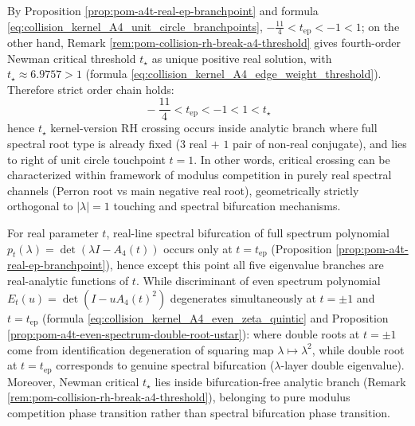 \begin{remark}\label{rem:pom-a4t-newman-unit-circle-separation}
By Proposition \ref{prop:pom-a4t-real-ep-branchpoint} and formula \eqref{eq:collision_kernel_A4_unit_circle_branchpoints},
\(
-\frac{11}{4}<t_{\mathrm{ep}}<-1<1
\);
on the other hand, Remark \ref{rem:pom-collision-rh-break-a4-threshold} gives fourth-order Newman critical threshold \(t_\star\) as unique positive real solution, with \(t_\star\approx 6.9757>1\) (formula \eqref{eq:collision_kernel_A4_edge_weight_threshold}).
Therefore strict order chain holds:
\[
\boxed{\;-\frac{11}{4}<t_{\mathrm{ep}}<-1<1<t_\star\;}
\]
hence \(t_\star\) kernel-version RH crossing occurs inside analytic branch where full spectral root type is already fixed (\(3\) real \(+\) \(1\) pair of non-real conjugate), and lies to right of unit circle touchpoint \(t=1\).
In other words, critical crossing can be characterized within framework of modulus competition in purely real spectral channels (Perron root vs main negative real root), geometrically strictly orthogonal to \(|\lambda|=1\) touching and spectral bifurcation mechanisms.
\end{remark}

\begin{conclusion}\label{con:pom-a4t-branching-layered-structure}
For real parameter \(t\), real-line spectral bifurcation of full spectrum polynomial \(p_t(\lambda)=\det(\lambda I-A_4(t))\) occurs only at \(t=t_{\mathrm{ep}}\) (Proposition \ref{prop:pom-a4t-real-ep-branchpoint}), hence except this point all five eigenvalue branches are real-analytic functions of \(t\).
While discriminant of even spectrum polynomial \(E_t(u)=\det(I-uA_4(t)^2)\) degenerates simultaneously at \(t=\pm1\) and \(t=t_{\mathrm{ep}}\) (formula \eqref{eq:collision_kernel_A4_even_zeta_quintic} and Proposition \ref{prop:pom-a4t-even-spectrum-double-root-ustar}):
where double roots at \(t=\pm1\) come from identification degeneration of squaring map \(\lambda\mapsto \lambda^2\),
while double root at \(t=t_{\mathrm{ep}}\) corresponds to genuine spectral bifurcation (\(\lambda\)-layer double eigenvalue).
Moreover, Newman critical \(t_\star\) lies inside bifurcation-free analytic branch (Remark \ref{rem:pom-collision-rh-break-a4-threshold}), belonging to pure modulus competition phase transition rather than spectral bifurcation phase transition.
\end{conclusion}

